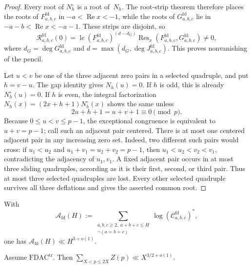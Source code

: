 \begin{proof}
Every root of $N_h^\circ$ is a root of~$N_h$.  The root-strip theorem
therefore places the roots of $F^{\mathrm{fd}}_{a,b,c}$ in
$-a<\operatorname{Re}x<-1$, while the roots of
$G^{\mathrm{fd}}_{a,b,c}$ lie in
$-a-b<\operatorname{Re}x<-a-1$.  These strips are disjoint, so
\[
 \mathcal R^{\mathrm{fd}}_{a,b,c}(0)
 =\operatorname{lc}(F^{\mathrm{fd}}_{a,b,c})^{(d-d_G)}
   \operatorname{Res}_x(F^{\mathrm{fd}}_{a,b,c},
                         G^{\mathrm{fd}}_{a,b,c})\ne0,
\]
where $d_G=\deg G^{\mathrm{fd}}_{a,b,c}$ and
$d=\max(d_G,\deg J^{\mathrm{fd}}_{a,b,c})$.
This proves nonvanishing of the pencil.

Let $u<v$ be one of the three adjacent zero pairs in a selected
quadruple, and put $h=v-u$.  The gap identity gives $N_h(u)=0$.
If $h$ is odd, this is already $N_h^\circ(u)=0$.  If $h$ is even,
the integral factorization
$N_h(x)=(2x+h+1)N_h^\circ(x)$ shows the same unless
\[
 2u+h+1=u+v+1\equiv0\pmod p.
\]
Because $0\le u<v\le p-1$, the exceptional congruence is equivalent
to $u+v=p-1$; call such an adjacent pair centered.  There is at most
one centered adjacent pair in any increasing zero set.  Indeed, two
different such pairs would cross: if $u_1<u_2$ and
$u_1+v_1=u_2+v_2=p-1$, then $u_1<u_2<v_2<v_1$, contradicting the
adjacency of $u_1,v_1$.  A fixed
adjacent pair occurs in at most three sliding quadruples, according as
it is their first, second, or third pair.  Thus at most three selected
quadruples are lost.  Every other selected quadruple survives all
three deflations and gives the asserted common root.
\end{proof}

\begin{hypothesis}
\label{hyp:qc-fdac}
With
\[
 \mathcal A_{\mathrm{fd}}(H)
 :=\sum_{\substack{a,b,c\ge2,\ a+b+c\le H\\
                    \neg(a=b=c)}}
 \log (\mathcal C^{\mathrm{fd}}_{a,b,c})^*,
\]
one has $\mathcal A_{\mathrm{fd}}(H)\ll H^{3+o(1)}$.
\end{hypothesis}

\begin{theorem}
\label{thm:qc-fd-main}
Assume $\mathrm{FDAC}^{\mathrm{tr}}$.  Then
$\sum_{X<p\le2X}Z(p)\ll X^{3/2+o(1)}$.
\end{theorem}

